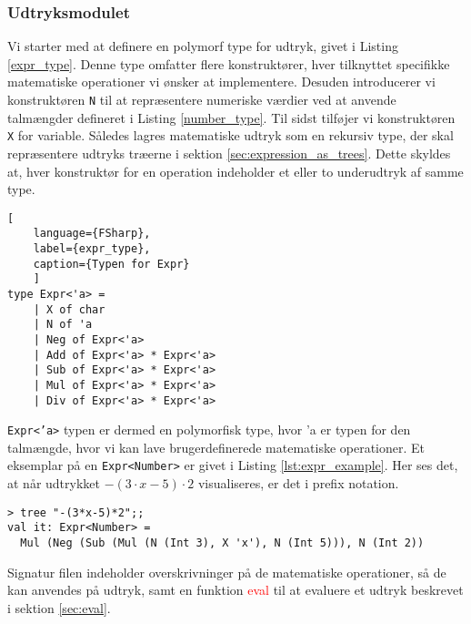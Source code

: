 \subsubsection{Udtryksmodulet}\label{sec:expression_module}
Vi starter med at definere en polymorf type for udtryk, givet i Listing \ref{expr_type}. Denne type omfatter flere konstruktører, hver tilknyttet specifikke matematiske operationer vi ønsker at implementere. Desuden introducerer vi konstruktøren \texttt{N} til at repræsentere numeriske værdier ved at anvende talmængder defineret i Listing \ref{number_type}. Til sidst tilføjer vi konstruktøren \texttt{X} for variable. Således lagres matematiske udtryk som en rekursiv type, der skal repræsentere udtryks træerne i sektion \ref{sec:expression_as_trees}. Dette skyldes at, hver konstruktør for en operation indeholder et eller to underudtryk af samme type.


\begin{lstlisting}[
    language={FSharp}, 
    label={expr_type}, 
    caption={Typen for Expr}
    ]
type Expr<'a> = 
    | X of char
    | N of 'a
    | Neg of Expr<'a>
    | Add of Expr<'a> * Expr<'a>
    | Sub of Expr<'a> * Expr<'a>
    | Mul of Expr<'a> * Expr<'a>
    | Div of Expr<'a> * Expr<'a>
\end{lstlisting}

\texttt{Expr<'a>}  typen er dermed en polymorfisk type, hvor 'a er typen for den talmængde, hvor vi kan lave brugerdefinerede matematiske operationer. Et eksemplar på en \texttt{Expr<Number>}  er givet i Listing \ref{lst:expr_example}. Her ses det, at når udtrykket $-(3 \cdot x - 5) \cdot 2$ visualiseres, er det i prefix notation. 

\begin{lstlisting}[style=output, label={lst:expr_example}, caption={$-(3 \cdot x - 5) \cdot 2$ som et udtryks træ. Funktionen \textcolor{red}{tree} bliver beskrevet i \ref{sec:expression_generation}.}]
> tree "-(3*x-5)*2";;
val it: Expr<Number> = 
  Mul (Neg (Sub (Mul (N (Int 3), X 'x'), N (Int 5))), N (Int 2))
\end{lstlisting}

Signatur filen indeholder overskrivninger på de matematiske operationer, så de kan anvendes på udtryk, samt en funktion \textcolor{red}{eval} til at evaluere et udtryk beskrevet i sektion \ref{sec:eval}. 




